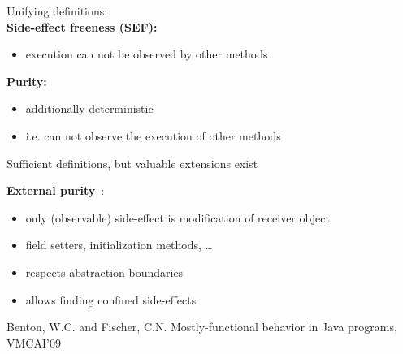 \documentclass{beamer}
\begin{document}
\begin{frame}
Unifying definitions:\\

\vspace{7mm}
\textbf{Side-effect freeness (SEF):}
\begin{itemize}
	\item execution can not be observed by other methods
\end{itemize}
\vspace{7mm}
\textbf{Purity:}
\begin{itemize}
	\item additionally deterministic
	\item i.e. can not observe the execution of other methods
\end{itemize}
\vspace{7mm}
\pause
Sufficient definitions, but valuable extensions exist
\end{frame}

\begin{frame}
\vspace{7mm}
\begin{overlayarea}{\textwidth}{0.65\textheight}
\textbf{External purity}~\cite{MostlyFunctional}:
\begin{itemize}
	\item only (observable) side-effect is modification of receiver object
	\item field setters, initialization methods, \dots
	\item respects abstraction boundaries
	\item allows finding confined side-effects
\end{itemize}
\end{overlayarea}

\begin{thebibliography}{99999}
Benton, W.C. and Fischer, C.N. \newblock Mostly-functional behavior in Java programs, \newblock VMCAI'09
\end{thebibliography}
\end{frame}
\end{document}
